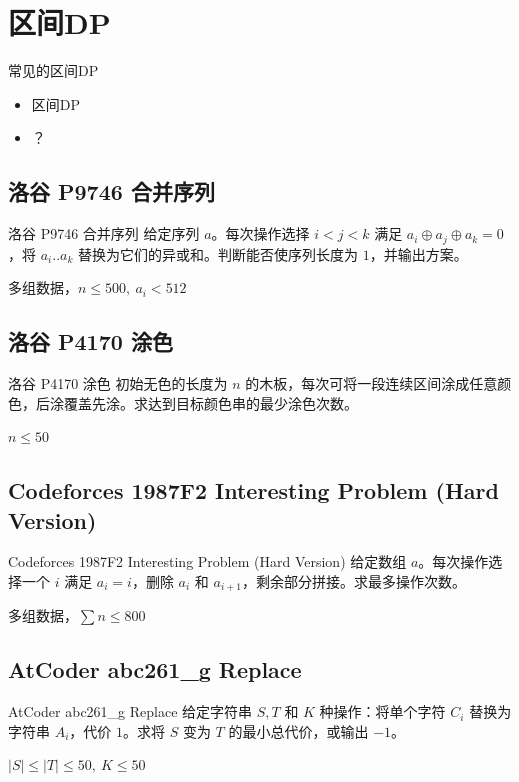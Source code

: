 ﻿\documentclass[aspectratio=169]{ctexbeamer}
\begin{document}
\section{区间DP}

\begin{frame}{常见的区间DP}
    \begin{itemize}
        \item 区间DP
        \item ？
    \end{itemize}
\end{frame}

\subsection{洛谷 P9746 合并序列}
\begin{frame}{洛谷 P9746 合并序列}
    给定序列 $a$。每次操作选择 $i<j<k$ 满足 $a_i\oplus a_j\oplus a_k=0$，将 $a_i..a_k$ 替换为它们的异或和。判断能否使序列长度为 $1$，并输出方案。
    
    多组数据，$n\le 500,\ a_i<512$
\end{frame}

\subsection{洛谷 P4170 涂色}
\begin{frame}{洛谷 P4170 涂色}
    初始无色的长度为 $n$ 的木板，每次可将一段连续区间涂成任意颜色，后涂覆盖先涂。求达到目标颜色串的最少涂色次数。
    
    $n\le 50$
\end{frame}

\subsection{Codeforces 1987F2 Interesting Problem (Hard Version)}
\begin{frame}{Codeforces 1987F2 Interesting Problem (Hard Version)}
    给定数组 $a$。每次操作选择一个 $i$ 满足 $a_i=i$，删除 $a_i$ 和 $a_{i+1}$，剩余部分拼接。求最多操作次数。
    
    多组数据，$\sum n\le 800$
\end{frame}

\subsection{AtCoder abc261\_g Replace}
\begin{frame}{AtCoder abc261\_g Replace}
    给定字符串 $S,T$ 和 $K$ 种操作：将单个字符 $C_i$ 替换为字符串 $A_i$，代价 $1$。求将 $S$ 变为 $T$ 的最小总代价，或输出 $-1$。
    
    $|S|\le|T|\le 50,\ K\le 50$
\end{frame}
\end{document}

